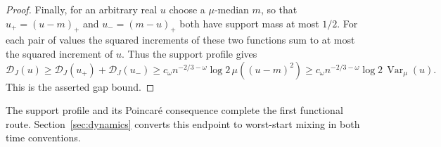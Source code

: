 \begin{proof}
Finally, for an arbitrary real $u$ choose a $\mu$-median $m$, so that
$u_+=(u-m)_+$ and $u_-=(m-u)_+$ both have support mass at most $1/2$.
For each pair of values the squared increments of these two functions sum
to at most the squared increment of $u$.  Thus the support profile gives
\[
 \mathcal D_J(u)\ge\mathcal D_J(u_+)+\mathcal D_J(u_-)
 \ge c_\omega n^{-2/3-\omega}\log2\,\mu((u-m)^2)
 \ge c_\omega n^{-2/3-\omega}\log2\,
                 \operatorname{Var}_\mu(u).
\]
This is the asserted gap bound.
\end{proof}

The support profile and its Poincar\'e consequence complete the first
functional route. Section~\ref{sec:dynamics} converts this endpoint to
worst-start mixing in both time conventions.
